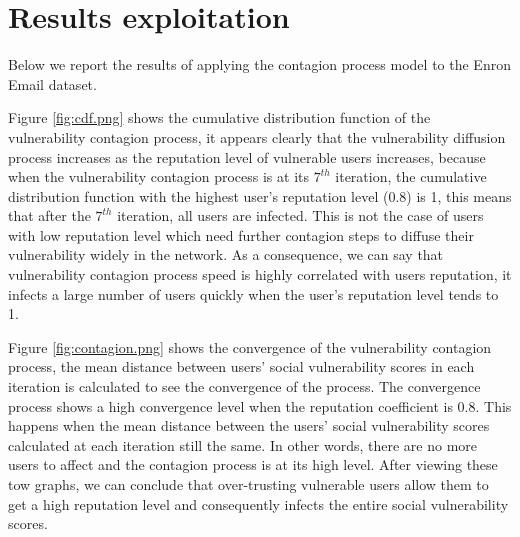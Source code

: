 \section{Results exploitation} \label{sec:Results exploitation}

Below we report the results of applying the contagion process model to the Enron Email dataset.


Figure \ref{fig:cdf.png} shows the cumulative distribution function of the vulnerability contagion process,
	it appears clearly that the vulnerability diffusion process increases as the reputation level of vulnerable users increases,
	because when the vulnerability contagion process is at its $7^{th}$ iteration,
	the cumulative distribution function with the highest user's reputation level (0.8) is 1,
	this means that after the $7^{th}$ iteration,
	all users are infected.
This is not the case of users with low reputation level which need further contagion steps to diffuse their vulnerability widely in the network.
As a consequence,
	we can say that vulnerability contagion process speed is highly correlated with users reputation,
	it infects a large number of users quickly when the user's reputation level tends to 1.


Figure \ref{fig:contagion.png} shows the convergence of the vulnerability contagion process,
	the mean distance between users' social vulnerability scores in each iteration is calculated to see the convergence of the process.
The convergence process shows a high convergence level when the reputation coefficient is 0.8.
This happens when the mean distance between the users' social vulnerability scores calculated at each iteration still the same.
In other words,
	there are no more users to affect and the contagion process is at its high level.
After viewing these tow graphs,
	we can conclude that over-trusting vulnerable users allow them to get a high reputation level and consequently infects the entire social vulnerability scores.


